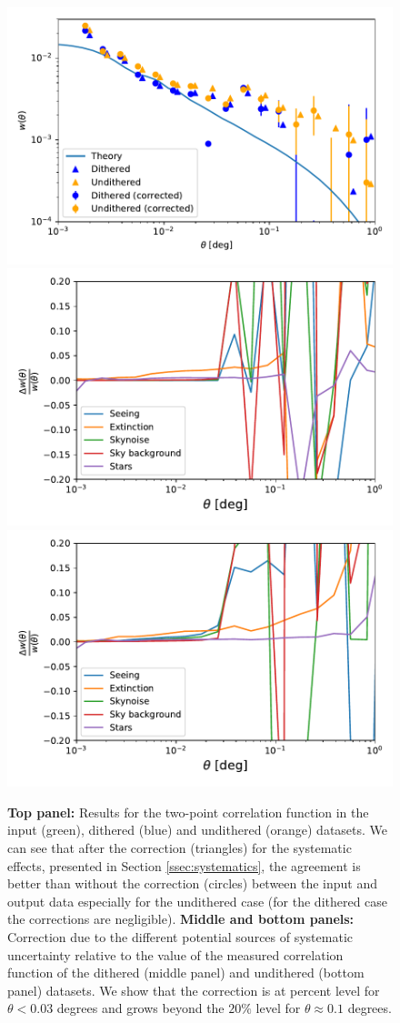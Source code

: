 \documentclass[\docopts]{\docclass}
\begin{document}
\begin{figure}
\centering
\includegraphics[width=0.9\columnwidth]{w_comp_corr25p3.pdf}
\includegraphics[width=0.9\columnwidth]{sys_dithered_25p3_v2.pdf}
\includegraphics[width=0.9\columnwidth]{sys_undithered_25p3_v2.pdf}
\caption{{\bf Top panel:} Results for the two-point correlation function in the input (green), dithered (blue) and undithered (orange) datasets. We can see that after the correction (triangles) for the systematic effects, presented in Section \ref{ssec:systematics}, the agreement is better than without the correction (circles) between the input and output data especially for the undithered case (for the dithered case the corrections are negligible). {\bf Middle and bottom panels:} Correction due to the different potential sources of systematic uncertainty relative to the value of the measured correlation function of the dithered (middle panel) and undithered (bottom panel) datasets. We show that the correction is at percent level for $\theta<0.03$ degrees and grows beyond the $20\%$ level for $\theta \approx 0.1$ degrees.} 

\end{figure}
\end{document}
